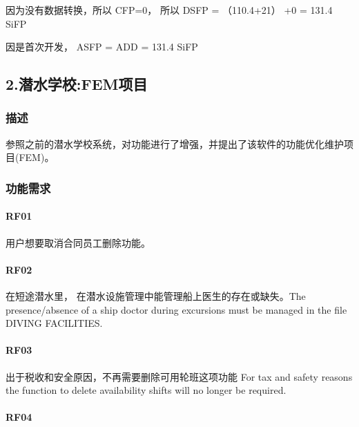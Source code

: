 因为没有数据转换，所以 CFP=0， 所以 DSFP = （110.4+21） +0 = 131.4 SiFP

因是首次开发， ASFP = ADD = 131.4 SiFP

\hypertarget{ux6f5cux6c34ux5b66ux6821femux9879ux76ee}{%
\subsection{2.潜水学校:FEM项目}\label{ux6f5cux6c34ux5b66ux6821femux9879ux76ee}}

\hypertarget{ux63cfux8ff0-1}{%
\subsubsection{描述}\label{ux63cfux8ff0-1}}

参照之前的潜水学校系统，对功能进行了增强，并提出了该软件的功能优化维护项目(FEM)。

\hypertarget{ux529fux80fdux9700ux6c42-1}{%
\subsubsection{功能需求}\label{ux529fux80fdux9700ux6c42-1}}

\hypertarget{rf01-1}{%
\paragraph{RF01}\label{rf01-1}}

用户想要取消合同员工删除功能。

\hypertarget{rf02-1}{%
\paragraph{RF02}\label{rf02-1}}

在短途潜水里， 在潜水设施管理中能管理船上医生的存在或缺失。The
presence/absence of a ship doctor during excursions must be managed in
the file DIVING FACILITIES.

\hypertarget{rf03-1}{%
\paragraph{RF03}\label{rf03-1}}

出于税收和安全原因，不再需要删除可用轮班这项功能 For tax and safety
reasons the function to delete availability shifts will no longer be
required.

\hypertarget{rf04-1}{%
\paragraph{RF04}\label{rf04-1}}

